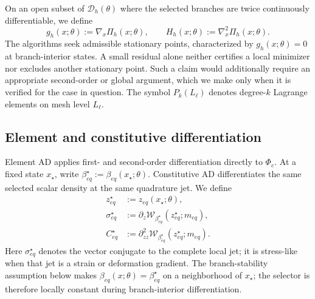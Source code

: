 On an open subset of $\mathcal{D}_h(\theta)$ where the selected branches are
twice continuously differentiable, we define
\begin{equation}
  g_h(x;\theta):=\nabla_x\Pi_h(x;\theta),
  \qquad H_h(x;\theta):=\nabla_x^2\Pi_h(x;\theta).
  \label{eq:global-gradient-hessian}
\end{equation}
The algorithms seek admissible stationary points, characterized by
$g_h(x;\theta)=0$ at branch-interior states. A small residual alone neither
certifies a local minimizer nor excludes another stationary point. Such a
claim would additionally require an appropriate second-order or global
argument, which we make only when it is verified for the case in question.
The symbol $P_k(L_\ell)$ denotes degree-$k$ Lagrange elements on mesh level
$L_\ell$.

\subsection{Element and constitutive differentiation}
\label{subsec:element-constitutive-equivalence}

Element AD applies first- and second-order differentiation directly to
$\Phi_e$. At a fixed state $x_\star$, write
$\beta_{eq}^\star:=\beta_{eq}(x_\star;\theta)$. Constitutive AD differentiates
the same selected scalar density at the same quadrature jet. We define
\begin{equation}
  \begin{aligned}
  z_{eq}^\star
    &:=z_{eq}(x_\star;\theta),\\
  \sigma_{eq}^\star
    &:=\partial_z
      \mathcal{W}_{\beta_{eq}^\star}
      (z_{eq}^\star;m_{eq}),\\
  C_{eq}^\star
    &:=\partial^2_{zz}
      \mathcal{W}_{\beta_{eq}^\star}
      (z_{eq}^\star;m_{eq}).
  \end{aligned}
  \label{eq:constitutive-objects}
\end{equation}
Here $\sigma_{eq}^\star$ denotes the vector conjugate to the complete local jet;
it is stress-like when that jet is a strain or deformation gradient. The
branch-stability assumption below makes
$\beta_{eq}(x;\theta)=\beta_{eq}^\star$ on a neighborhood of $x_\star$; the selector
is therefore locally constant during branch-interior differentiation.

